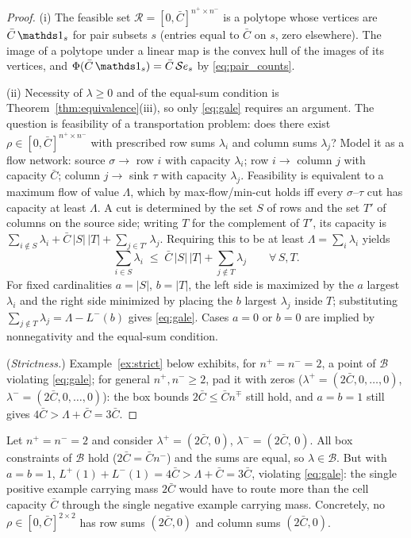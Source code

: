 \begin{proof}
(i) The feasible set $\mathcal{R} = [0,\bar{C}]^{n^+ \times n^-}$ is a
polytope whose vertices are $\bar{C}\,\mathbbm{1}_s$ for pair subsets $s$
(entries equal to $\bar{C}$ on $s$, zero elsewhere). The image of a polytope
under a linear map is the convex hull of the images of its vertices, and
$\Phi(\bar{C}\,\mathbbm{1}_s) = \bar{C}\,\mathcal{S}e_s$ by
\eqref{eq:pair_counts}.

(ii) Necessity of $\lambda \ge 0$ and of the equal-sum condition is
Theorem~\ref{thm:equivalence}(iii), so only \eqref{eq:gale} requires an
argument. The question is feasibility of a transportation problem: does there
exist $\rho \in [0,\bar{C}]^{n^+ \times n^-}$ with prescribed row sums
$\lambda_i$ and column sums $\lambda_j$? Model it as a flow network: source
$\sigma \to$ row $i$ with capacity $\lambda_i$; row $i \to$ column $j$ with
capacity $\bar{C}$; column $j \to$ sink $\tau$ with capacity $\lambda_j$.
Feasibility is equivalent to a maximum flow of value $\Lambda$, which by
max-flow/min-cut holds iff every $\sigma$--$\tau$ cut has capacity at least
$\Lambda$. A cut is determined by the set $S$ of rows and the set $T'$ of
columns on the source side; writing $T$ for the complement of $T'$, its
capacity is
$\sum_{i \notin S}\lambda_i + \bar{C}\,|S|\,|T| + \sum_{j \in
T'}\lambda_j$. Requiring this to be at least $\Lambda = \sum_i \lambda_i$
yields
\[
\sum_{i \in S} \lambda_i \;\le\; \bar{C}\,|S|\,|T| + \sum_{j \notin T} \lambda_j
\qquad \forall\, S, T .
\]
For fixed cardinalities $a = |S|$, $b = |T|$, the left side is maximized by
the $a$ largest $\lambda_i$ and the right side minimized by placing the $b$
largest $\lambda_j$ inside $T$; substituting
$\sum_{j \notin T}\lambda_j = \Lambda - L^-(b)$ gives \eqref{eq:gale}. Cases
$a = 0$ or $b = 0$ are implied by nonnegativity and the equal-sum condition.

(\emph{Strictness.}) Example~\ref{ex:strict} below exhibits, for
$n^+ = n^- = 2$, a point of $\mathcal{B}$ violating \eqref{eq:gale}; for
general $n^+, n^- \ge 2$, pad it with zeros
($\lambda^+ = (2\bar{C}, 0, \dots, 0)$,
$\lambda^- = (2\bar{C}, 0, \dots, 0)$): the box bounds
$2\bar{C} \le \bar{C}n^\mp$ still hold, and $a = b = 1$ still gives
$4\bar{C} > \Lambda + \bar{C} = 3\bar{C}$.
\end{proof}

\begin{example}
\label{ex:strict}
Let $n^+ = n^- = 2$ and consider
$\lambda^+ = (2\bar{C},\, 0)$, $\lambda^- = (2\bar{C},\, 0)$. All box
constraints of $\mathcal{B}$ hold ($2\bar{C} = \bar{C}n^-$) and the sums are
equal, so $\lambda \in \mathcal{B}$. But with $a = b = 1$,
$L^+(1) + L^-(1) = 4\bar{C} > \Lambda + \bar{C} = 3\bar{C}$, violating
\eqref{eq:gale}: the single positive example carrying mass $2\bar{C}$ would
have to route more than the cell capacity $\bar{C}$ through the single
negative example carrying mass. Concretely, no $\rho \in [0,\bar{C}]^{2\times
2}$ has row sums $(2\bar{C}, 0)$ and column sums $(2\bar{C}, 0)$.
\end{example}

